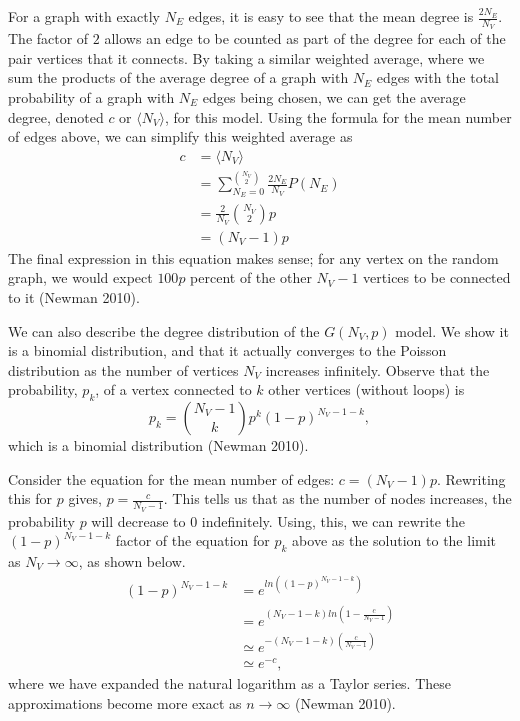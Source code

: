 \documentclass[12pt,twoside]{amherstthesis}
\begin{document}
  For a graph with exactly \(N_{E}\) edges, it is easy to see that the
  mean degree is \(\frac {2N_{E}} {N_{V}}\). The factor of \(2\) allows an
  edge to be counted as part of the degree for each of the pair vertices
  that it connects. By taking a similar weighted average, where we sum the
  products of the average degree of a graph with \(N_{E}\) edges with the
  total probability of a graph with \(N_E\) edges being chosen, we can get
  the average degree, denoted \(c\) or \(\langle N_{V} \rangle\), for this
  model. Using the formula for the mean number of edges above, we can
  simplify this weighted average as \[
  \begin{aligned}
  c &= \langle N_{V} \rangle \\
  &= \sum_{N_{E}=0}^{{N_{V} \choose 2}} \frac {2N_{E}} {N_{V}} P(N_{E}) \\
  &= \frac {2} {N_{V}} {N_{V} \choose 2}p \\
  &= (N_{V} - 1)p
  \end{aligned}
  \] The final expression in this equation makes sense; for any vertex on
  the random graph, we would expect \(100p\) percent of the other
  \(N_{V} - 1\) vertices to be connected to it (Newman 2010).
  
  We can also describe the degree distribution of the \(G(N_{V}, p)\)
  model. We show it is a binomial distribution, and that it actually
  converges to the Poisson distribution as the number of vertices
  \(N_{V}\) increases infinitely. Observe that the probability, \(p_{k}\),
  of a vertex connected to \(k\) other vertices (without loops) is
  \[p_{k} = {N_{V} - 1 \choose k}p^{k}(1 - p)^{N_{V} - 1 - k},\] which is
  a binomial distribution (Newman 2010).
  
  Consider the equation for the mean number of edges:
  \(c = (N_{V} - 1)p\). Rewriting this for \(p\) gives,
  \(p = \frac {c} {N_{V} - 1}\). This tells us that as the number of nodes
  increases, the probability \(p\) will decrease to \(0\) indefinitely.
  Using, this, we can rewrite the \((1 - p)^{N_{V} - 1 - k}\) factor of
  the equation for \(p_{k}\) above as the solution to the limit as
  \(N_{V} \to \infty\), as shown below. \[
  \begin{aligned}
  (1 - p)^{N_{V} - 1 - k} &= e^{ln((1 - p)^{N_{V} - 1 - k})} \\
  &= e^{(N_{V} - 1 - k) ln(1 - \frac {c} {N_{V} - 1})} \\
  &\simeq e^{-(N_{V} - 1 - k)(\frac {c} {N_{V} - 1})} \\
  &\simeq e^{-c},
  \end{aligned}
  \] where we have expanded the natural logarithm as a Taylor series.
  These approximations become more exact as \(n \to \infty\) (Newman
  2010).
  
\end{document}
